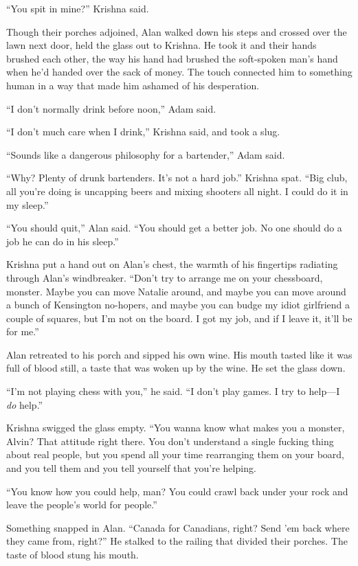 ``You spit in mine?'' Krishna said.

Though their porches adjoined, Alan walked down his steps and crossed
over the lawn next door, held the glass out to Krishna.  He took it
and their hands brushed each other, the way his hand had brushed the
soft-spoken man's hand when he'd handed over the sack of money.  The
touch connected him to something human in a way that made him ashamed
of his desperation.

``I don't normally drink before noon,'' Adam said.

``I don't much care when I drink,'' Krishna said, and took a slug.

``Sounds like a dangerous philosophy for a bartender,'' Adam said.

``Why?  Plenty of drunk bartenders.  It's not a hard job.'' Krishna
spat.  ``Big club, all you're doing is uncapping beers and mixing
shooters all night.  I could do it in my sleep.''

``You should quit,'' Alan said.  ``You should get a better job.  No
one should do a job he can do in his sleep.''

Krishna put a hand out on Alan's chest, the warmth of his fingertips
radiating through Alan's windbreaker.  ``Don't try to arrange me on
your chessboard, monster.  Maybe you can move Natalie around, and
maybe you can move around a bunch of Kensington no-hopers, and maybe
you can budge my idiot girlfriend a couple of squares, but I'm not on
the board.  I got my job, and if I leave it, it'll be for me.''

Alan retreated to his porch and sipped his own wine.  His mouth tasted
like it was full of blood still, a taste that was woken up by the
wine.  He set the glass down.

``I'm not playing chess with you,'' he said.  ``I don't play games.  I
try to help---I \textit{do} help.''

Krishna swigged the glass empty.  ``You wanna know what makes you a
monster, Alvin?  That attitude right there.  You don't understand a
single fucking thing about real people, but you spend all your time
rearranging them on your board, and you tell them and you tell
yourself that you're helping.

``You know how you could help, man?  You could crawl back under your
rock and leave the people's world for people.''

Something snapped in Alan.  ``Canada for Canadians, right?  Send 'em
back where they came from, right?'' He stalked to the railing that
divided their porches.  The taste of blood stung his mouth.

